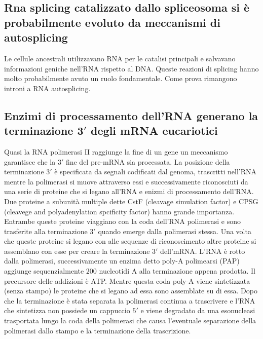 \subsection{Rna splicing catalizzato dallo spliceosoma si \`e probabilmente evoluto da meccanismi di autosplicing}
Le cellule ancestrali utilizzavano RNA  per le catalisi principali e salvavano informazioni geniche nell'RNA rispetto al DNA. Queste reazioni di splicing hanno molto probabilmente avuto
un ruolo fondamentale. Come prova rimangono introni a RNA autosplicing. 
\subsection{Enzimi di processamento dell'RNA generano la terminazione $\mathbf{3'}$ degli mRNA eucariotici}
Quasi la RNA polimerasi II raggiunge la fine di un gene un meccanismo garantisce che la $3'$ fine del pre-mRNA sia processata. La posizione della terminazione $3'$ \`e specificata da
segnali codificati dal genoma, trascritti nell'RNA mentre la polimerasi si muove attraverso essi e successivamente riconosciuti da una serie di proteine che si legano all'RNA e 
enizmi di processamento dell'RNA. Due proteine a subunit\`a multiple dette CstF (cleavage simulation factor) e CPSG (cleavege and polyadenylation spcificity factor) hanno grande 
importanza. Entrambe queste proteine viaggiano con la coda dell'RNA polimerasi e sono trasferite alla terminazione $3'$ quando emerge dalla polimerasi stessa. Una volta che queste
proteine si legano con alle sequenze di riconoscimento altre proteine si assemblano con esse per creare la terminazione $3'$ dell'mRNA. L'RNA \`e rotto dalla polimerasi, successivamente
un enzima detto poly-A polimearsi (PAP) aggiunge sequenzialmente $200$ nucleotidi A alla terminazione appena prodotta. Il precursore delle addizioni \`e ATP. Mentre questa coda poly-A
viene sintetizzata (senza stampo) le proteine che si legano ad essa sono assemblate su di essa. Dopo che la terminazione \`e stata separata la polimerasi continua a trascrivere e l'RNA
che sintetizza non possiede un cappuccio $5'$ e viene degradato da una esonucleasi trasportata lungo la coda della polimerasi che causa l'eventuale separazione della polimerasi dallo
stampo e la terminazione della trascrizione.
